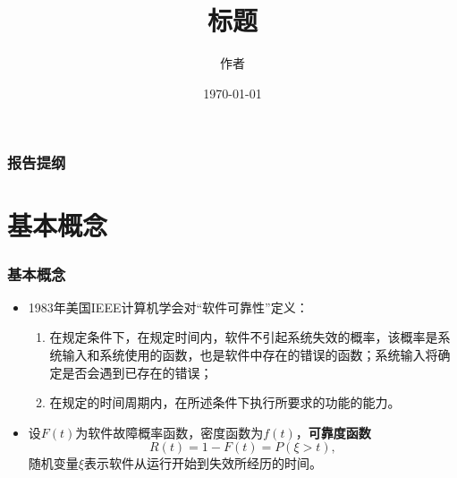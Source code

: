 \documentclass{beamer}
\begin{document}
\hypersetup{CJKbookmarks=true}

\title[短标题]{标题} %

\author{作者} %
\date{\today} %


\begin{frame}
\titlepage %
\thispagestyle{empty}
\addtocounter{framenumber}{-1}
\end{frame}

\begin{frame}
\frametitle{报告提纲} %
\tableofcontents %
\end{frame}

\section{基本概念}

\begin{frame}
\frametitle{基本概念}
\begin{itemize}
\item 1983年美国IEEE计算机学会对“软件可靠性”定义：
\begin{enumerate}
    \item 在规定条件下，在规定时间内，软件不引起系统失效的概率，该概率是系统输入和系统使用的函数，也是软件中存在的错误的函数；系统输入将确定是否会遇到已存在的错误；
    \item 在规定的时间周期内，在所述条件下执行所要求的功能的能力。
\end{enumerate}
\end{itemize}
\begin{itemize}
\item 设$F(t)$为软件故障概率函数，密度函数为$f(t)$，{\bf 可靠度函数}
\begin{equation}
R(t)=1-F(t)=P(\xi > t), \label{RelFun}
\end{equation}
随机变量$\xi$表示软件从运行开始到失效所经历的时间。
\end{itemize}
\end{frame}
\end{document}
